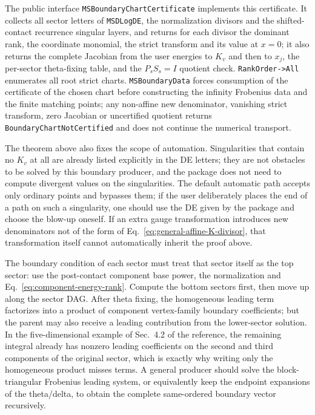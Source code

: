\documentclass[11pt,a4paper]{article}
\begin{document}
The public interface \texttt{MSBoundaryChartCertificate} implements this certificate. It collects all sector letters of \texttt{MSDLogDE}, the normalization divisors and the shifted-contact recurrence singular layers, and returns for each divisor the dominant rank, the coordinate monomial, the strict transform and its value at $x=0$; it also returns the complete Jacobian from the user energies to $K_v$ and then to $x_j$, the per-sector theta-fixing table, and the $P_sS_s=I$ quotient check. \texttt{RankOrder->All} enumerates all root strict charts. \texttt{MSBoundaryData} forces consumption of the certificate of the chosen chart before constructing the infinity Frobenius data and the finite matching points; any non-affine new denominator, vanishing strict transform, zero Jacobian or uncertified quotient returns \texttt{BoundaryChartNotCertified} and does not continue the numerical transport.

The theorem above also fixes the scope of automation. Singularities that contain no $K_v$ at all are already listed explicitly in the DE letters; they are not obstacles to be solved by this boundary producer, and the package does not need to compute divergent values on the singularities. The default automatic path accepts only ordinary points and bypasses them; if the user deliberately places the end of a path on such a singularity, one should use the DE given by the package and choose the blow-up oneself. If an extra gauge transformation introduces new denominators not of the form of Eq.~\eqref{eq:general-affine-K-divisor}, that transformation itself cannot automatically inherit the proof above.

The boundary condition of each sector must treat that sector itself as the top sector: use the post-contact component base power, the normalization and Eq.~\eqref{eq:component-energy-rank}. Compute the bottom sectors first, then move up along the sector DAG. After theta fixing, the homogeneous leading term factorizes into a product of component vertex-family boundary coefficients; but the parent may also receive a leading contribution from the lower-sector solution. In the five-dimensional example of Sec.~4.2 of the reference, the remaining integral already has nonzero leading coefficients on the second and third components of the original sector, which is exactly why writing only the homogeneous product misses terms. A general producer should solve the block-triangular Frobenius leading system, or equivalently keep the endpoint expansions of the theta/delta, to obtain the complete same-ordered boundary vector recursively.
\end{document}
